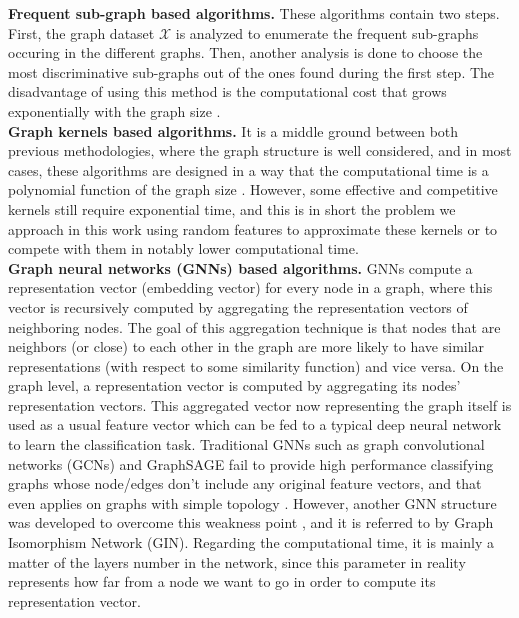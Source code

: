 \noindent\textbf{Frequent sub-graph based algorithms.} These algorithms contain two steps. First, the graph dataset $\mathcal{X}$ is analyzed to enumerate the frequent sub-graphs occuring in the different graphs. Then, another analysis is done to choose the most discriminative sub-graphs out of the ones found during the first step. The disadvantage of using this method is the computational cost that grows exponentially with the graph size \citep{graphlet_kernel}. \\

\noindent\textbf{Graph kernels based algorithms.} It is a middle ground between both previous methodologies, where the graph structure is well considered, and in most cases, these algorithms are designed in a way that the computational time is a polynomial function of the graph size \citep{graphlet_kernel}. However, some effective and competitive kernels still require exponential time, and this is in short the problem we approach in this work using random features to approximate these kernels or to compete with them in notably lower computational time. \\

\noindent\textbf{Graph neural networks (GNNs) based algorithms.} GNNs compute a representation vector (embedding vector) for every node in a graph, where this vector is recursively computed by aggregating the representation vectors of neighboring nodes. The goal of this aggregation technique is that nodes that are neighbors (or close) to each other in the graph are more likely to have similar representations (with respect to some similarity function) and vice versa. On the graph level, a representation vector is computed by aggregating its nodes' representation vectors. This aggregated vector now representing the graph itself is used as a usual feature vector which can be fed to a typical deep neural network to learn the classification task. Traditional GNNs such as graph convolutional networks (GCNs) and GraphSAGE fail to provide high performance classifying graphs whose node/edges don't include any original feature vectors, and that even applies on graphs with simple topology \citep{GCN_powerful}.  
However, another GNN structure was developed to overcome this weakness point , and it is referred to by Graph Isomorphism Network (GIN). Regarding the computational time, it is mainly a matter of the layers number in the network, since this parameter in reality represents how far from a node we want to go in order to compute its representation vector. 

